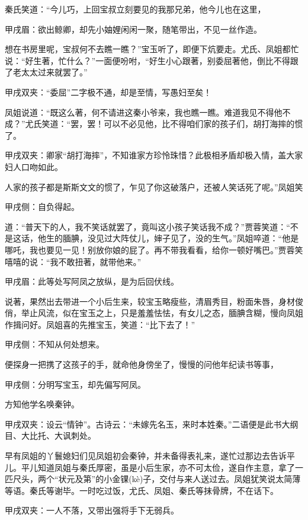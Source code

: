 \begin{parag}
    秦氏笑道：“今儿巧，上回宝叔立刻要见的我那兄弟，他今儿也在这里，\begin{note}甲戌眉：欲出鲸卿，却先小妯娌闲闲一聚，随笔带出，不见一丝作造。\end{note}想在书房里呢，宝叔何不去瞧一瞧？”宝玉听了，即便下炕要走。尤氏、凤姐都忙说：“好生著，忙什么？”一面便吩咐，“好生小心跟著，别委屈著他，倒比不得跟了老太太过来就罢了。”\begin{note}甲戌双夹：“委屈”二字极不通，却是至情，写愚妇至矣！\end{note}凤姐说道：“既这么著，何不请进这秦小爷来，我也瞧一瞧。难道我见不得他不成？”尤氏笑道：“罢，罢！可以不必见他，比不得咱们家的孩子们，胡打海摔的惯了。\begin{note}甲戌双夹：卿家“胡打海摔”，不知谁家方珍怜珠惜？此极相矛盾却极入情，盖大家妇人口吻如此。\end{note}人家的孩子都是斯斯文文的惯了，乍见了你这破落户，还被人笑话死了呢。”凤姐笑\begin{note}甲戌侧：自负得起。\end{note}道：“普天下的人，我不笑话就罢了，竟叫这小孩子笑话我不成？”贾蓉笑道：“不是这话，他生的腼腆，没见过大阵仗儿，婶子见了，没的生气。”凤姐啐道：“他是哪吒，我也要见一见！别放你娘的屁了。再不带我看看，给你一顿好嘴巴。”贾蓉笑嘻嘻的说：“我不敢扭著，就带他来。”\begin{note}甲戌眉：此等处写阿凤之放纵，是为后回伏线。\end{note}
\end{parag}


\begin{parag}
    说著，果然出去带进一个小后生来，较宝玉略瘦些，清眉秀目，粉面朱唇，身材俊俏，举止风流，似在宝玉之上，只是羞羞怯怯，有女儿之态，腼腆含糊，慢向凤姐作揖问好。凤姐喜的先推宝玉，笑道：“比下去了！”\begin{note}甲戌侧：不知从何处想来。\end{note}便探身一把携了这孩子的手，就命他身傍坐了，慢慢的问他年纪读书等事，\begin{note}甲戌侧：分明写宝玉，却先偏写阿凤。\end{note}方知他学名唤秦钟。\begin{note}甲戌双夹：设云“情钟”。古诗云：“未嫁先名玉，来时本姓秦。”二语便是此书大纲目、大比托、大讽刺处。\end{note}早有凤姐的丫鬟媳妇们见凤姐初会秦钟，并未备得表礼来，遂忙过那边去告诉平儿。平儿知道凤姐与秦氏厚密，虽是小后生家，亦不可太俭，遂自作主意，拿了一匹尺头，两个“状元及第”的小金锞(kè)子，交付与来人送过去。凤姐犹笑说太简薄等语。秦氏等谢毕。一时吃过饭，尤氏、凤姐、秦氏等抹骨牌，不在话下。\begin{note}甲戌双夹：一人不落，又带出强将手下无弱兵。\end{note}
\end{parag}


